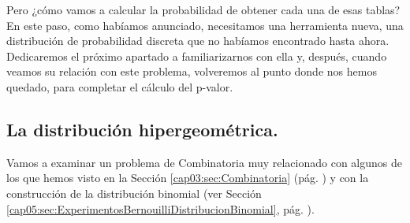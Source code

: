 Pero ¿cómo vamos a calcular la probabilidad de obtener cada una de esas tablas? En este paso, como habíamos anunciado, necesitamos una herramienta nueva, una distribución de probabilidad discreta que no habíamos encontrado hasta ahora. Dedicaremos el próximo apartado a familiarizarnos con ella y, después, cuando veamos su relación con este problema, volveremos al punto donde nos hemos quedado, para completar el cálculo del p-valor.


\subsection{La distribución hipergeométrica.}
\label{cap12:subsec:DistribucionHipergeometrica}

Vamos a examinar un problema de Combinatoria muy relacionado con algunos de los que hemos visto en la Sección \ref{cap03:sec:Combinatoria} (pág. \pageref{cap03:sec:Combinatoria}) y con la construcción de la distribución binomial (ver Sección \ref{cap05:sec:ExperimentosBernouilliDistribucionBinomial}, pág. \pageref{cap05:sec:ExperimentosBernouilliDistribucionBinomial}).


